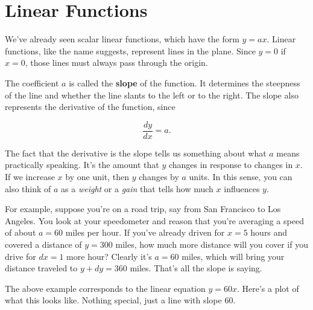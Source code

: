 \documentclass[
  letterpaper,
  DIV=11,
  numbers=noendperiod]{scrreprt}
\newenvironment{Shaded}{\begin{snugshade}}{\end{snugshade}}
\newcommand{\DecValTok}[1]{\textcolor[rgb]{0.68,0.00,0.00}{#1}}
\newcommand{\KeywordTok}[1]{\textcolor[rgb]{0.00,0.23,0.31}{#1}}
\newcommand{\NormalTok}[1]{\textcolor[rgb]{0.00,0.23,0.31}{#1}}
\newcommand{\OperatorTok}[1]{\textcolor[rgb]{0.37,0.37,0.37}{#1}}
\newcommand{\SpecialCharTok}[1]{\textcolor[rgb]{0.37,0.37,0.37}{#1}}
\newcommand{\SpecialStringTok}[1]{\textcolor[rgb]{0.13,0.47,0.30}{#1}}
\begin{document}
\hypertarget{linear-functions}{%
\section{Linear Functions}\label{linear-functions}}

We've already seen scalar linear functions, which have the form
\(y = ax\). Linear functions, like the name suggests, represent lines in
the plane. Since \(y=0\) if \(x=0\), those lines must always pass
through the origin.

The coefficient \(a\) is called the \textbf{slope} of the function. It
determines the steepness of the line and whether the line slants to the
left or to the right. The slope also represents the derivative of the
function, since

\[\frac{dy}{dx} = a.\]

The fact that the derivative is the slope tells us something about what
\(a\) means practically speaking. It's the amount that \(y\) changes in
response to changes in \(x\). If we increase \(x\) by one unit, then
\(y\) changes by \(a\) units. In this sense, you can also think of \(a\)
as a \emph{weight} or a \emph{gain} that tells how much \(x\) influences
\(y\).

For example, suppose you're on a road trip, say from San Francisco to
Los Angeles. You look at your speedometer and reason that you're
averaging a speed of about \(a=60\) miles per hour. If you've already
driven for \(x=5\) hours and covered a distance of \(y=300\) miles, how
much more distance will you cover if you drive for \(dx=1\) more hour?
Clearly it's \(a=60\) miles, which will bring your distance traveled to
\(y+dy=360\) miles. That's all the slope is saying.

The above example corresponds to the linear equation \(y=60x\). Here's a
plot of what this looks like. Nothing special, just a line with slope
\(60\).

\begin{Shaded}
\end{Shaded}
\end{document}
